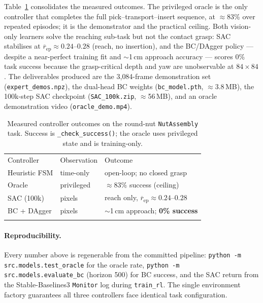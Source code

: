 \documentclass[10pt]{article}
\providecommand{\toprule}{\hline\noalign{\smallskip}}
\providecommand{\midrule}{\noalign{\smallskip}\hline\noalign{\smallskip}}
\providecommand{\bottomrule}{\noalign{\smallskip}\hline}
\newcommand{\code}[1]{\texttt{\small #1}}
\begin{document}
Table~\ref{tab:results} consolidates the measured outcomes. The privileged oracle
is the only controller that completes the full pick--transport--insert sequence,
at $\approx$83\% over repeated episodes; it is the demonstrator and the practical
ceiling. Both vision-only learners solve the reaching sub-task but not the contact
grasp: SAC stabilises at $\overline{r}_{\text{ep}}\!\approx\!0.24$--$0.28$ (reach,
no insertion), and the BC/DAgger policy --- despite a near-perfect training fit and
$\sim$1\,cm approach accuracy --- scores 0\% task success because the grasp-critical
depth and yaw are unobservable at $84{\times}84$. The deliverables produced are the
3{,}084-frame demonstration set (\code{expert\_demos.npz}), the dual-head BC weights
(\code{bc\_model.pth}, $\approx$3.8\,MB), the 100k-step SAC checkpoint
(\code{SAC\_100k.zip}, $\approx$56\,MB), and an oracle demonstration video
(\code{oracle\_demo.mp4}).

\begin{table}[t]
\centering
\caption{Measured controller outcomes on the round-nut \code{NutAssembly} task.
Success is \code{\_check\_success()}; the oracle uses privileged state and is
training-only.}
\label{tab:results}
\small
\begin{tabular}{l l l}
\toprule
Controller & Observation & Outcome \\
\midrule
Heuristic FSM   & time-only & open-loop; no closed grasp \\
Oracle          & privileged & $\approx$83\% success (ceiling) \\
SAC (100k)      & pixels & reach only, $\overline{r}_{\text{ep}}\!\approx\!0.24$--$0.28$ \\
BC + DAgger     & pixels & $\sim$1\,cm approach; \textbf{0\% success} \\
\bottomrule
\end{tabular}
\end{table}

\paragraph{Reproducibility.} Every number above is regenerable from the committed
pipeline: \code{python -m src.models.test\_oracle} for the oracle rate,
\code{python -m src.models.evaluate\_bc} (horizon 500) for BC success, and the SAC
return from the Stable-Baselines3 \code{Monitor} log during \code{train\_rl}. The
single environment factory guarantees all three controllers face identical task
configuration.
\end{document}
